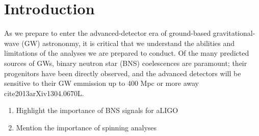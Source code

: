 \section{Introduction}

As we prepare to enter the advanced-detector era of ground-based gravitational-wave (GW) astrononmy, it is critical that we understand the abilities and limitations of the analyses we are prepared to conduct.  Of the many predicted sources of GWs, binary neutron star (BNS) coelescences are paramount; their progenitors have been directly observed, and the advanced detectors will be sensitive to their GW emmission up to 400 Mpc or more away \\cite{2013arXiv1304.0670L}.


\begin{enumerate}
\item Highlight the importance of BNS signals for aLIGO
\item Mention the importance of spinning analyses
\end{enumerate}